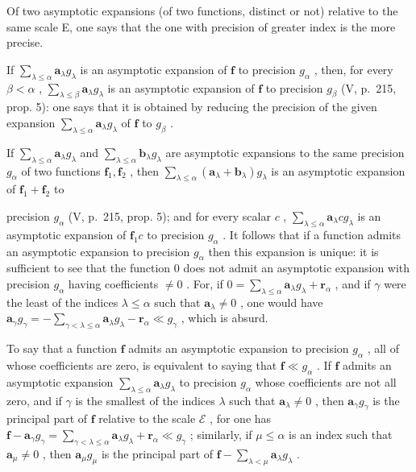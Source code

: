 Of two asymptotic expansions (of two functions, distinct or not) relative to the same scale E, one says that the one with precision of greater index is the more precise.

If \(\sum_{\lambda \leqslant \alpha} \mathbf{a}_{\lambda} g_{\lambda}\) is an asymptotic expansion of \(\mathbf{f}\) to precision \(g_{\alpha}\) , then, for every \(\beta < \alpha\) , \(\sum_{\lambda \leqslant \beta} \mathbf{a}_{\lambda} g_{\lambda}\) is an asymptotic expansion of \(\mathbf{f}\) to precision \(g_{\beta}\) (V, p.~215, prop. 5): one says that it is obtained by reducing the precision of the given expansion \(\sum_{\lambda \leqslant \alpha} \mathbf{a}_{\lambda} g_{\lambda}\) of \(\mathbf{f}\) to \(g_{\beta}\) .

If \(\sum_{\lambda \leqslant \alpha} \mathbf{a}_{\lambda} g_{\lambda}\) and \(\sum_{\lambda \leqslant \alpha} \mathbf{b}_{\lambda} g_{\lambda}\) are asymptotic expansions to the same precision \(g_{\alpha}\) of two functions \(\mathbf{f}_1, \mathbf{f}_2\) , then \(\sum_{\lambda \leqslant \alpha} (\mathbf{a}_{\lambda} + \mathbf{b}_{\lambda}) g_{\lambda}\) is an asymptotic expansion of \(\mathbf{f}_1 + \mathbf{f}_2\) to

precision \(g_{\alpha}\) (V, p.~215, prop. 5); and for every scalar \(c\) , \(\sum_{\lambda \leqslant \alpha} \mathbf{a}_{\lambda}cg_{\lambda}\) is an asymptotic expansion of \(\mathbf{f}_1c\) to precision \(g_{\alpha}\) . It follows that if a function admits an asymptotic expansion to precision \(g_{\alpha}\) then this expansion is unique: it is sufficient to see that the function 0 does not admit an asymptotic expansion with precision \(g_{\alpha}\) having coefficients \(\neq 0\) . For, if \(0 = \sum_{\lambda \leqslant \alpha} \mathbf{a}_{\lambda}g_{\lambda} + \mathbf{r}_{\alpha}\) , and if \(\gamma\) were the least of the indices \(\lambda \leqslant \alpha\) such that \(\mathbf{a}_{\lambda} \neq 0\) , one would have \(\mathbf{a}_{\gamma}g_{\gamma} = -\sum_{\gamma < \lambda \leqslant \alpha} \mathbf{a}_{\lambda}g_{\lambda} - \mathbf{r}_{\alpha} \ll g_{\gamma}\) , which is absurd.

To say that a function \(\mathbf{f}\) admits an asymptotic expansion to precision \(g_{\alpha}\) , all of whose coefficients are zero, is equivalent to saying that \(\mathbf{f} \ll g_{\alpha}\) . If \(\mathbf{f}\) admits an asymptotic expansion \(\sum_{\lambda \leqslant \alpha} \mathbf{a}_{\lambda} g_{\lambda}\) to precision \(g_{\alpha}\) whose coefficients are not all zero, and if \(\gamma\) is the smallest of the indices \(\lambda\) such that \(\mathbf{a}_{\lambda} \neq 0\) , then \(\mathbf{a}_{\gamma} g_{\gamma}\) is the principal part of \(\mathbf{f}\) relative to the scale \(\mathcal{E}\) , for one has \(\mathbf{f} - \mathbf{a}_{\gamma} g_{\gamma} = \sum_{\gamma < \lambda \leqslant \alpha} \mathbf{a}_{\lambda} g_{\lambda} + \mathbf{r}_{\alpha} \ll g_{\gamma}\) ; similarly, if \(\mu \leqslant \alpha\) is an index such that \(\mathbf{a}_{\mu} \neq 0\) , then \(\mathbf{a}_{\mu} g_{\mu}\) is the principal part of \(\mathbf{f} - \sum_{\lambda < \mu} \mathbf{a}_{\lambda} g_{\lambda}\) .

